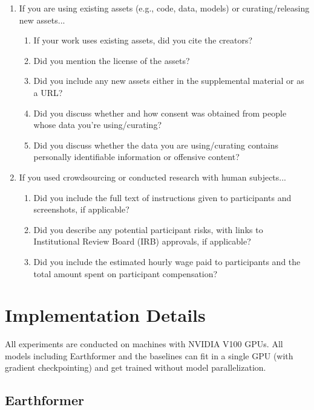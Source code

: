 \documentclass{article}
\begin{document}
\begin{enumerate}
\item If you are using existing assets (e.g., code, data, models) or curating/releasing new assets...
\begin{enumerate}
  \item If your work uses existing assets, did you cite the creators?
    \answerYes{}
  \item Did you mention the license of the assets?
    \answerYes{}
  \item Did you include any new assets either in the supplemental material or as a URL?
    \answerNo{}
  \item Did you discuss whether and how consent was obtained from people whose data you're using/curating?
    \answerNA{}
  \item Did you discuss whether the data you are using/curating contains personally identifiable information or offensive content?
    \answerNA{}
\end{enumerate}


\item If you used crowdsourcing or conducted research with human subjects...
\begin{enumerate}
  \item Did you include the full text of instructions given to participants and screenshots, if applicable?
    \answerNA{}
  \item Did you describe any potential participant risks, with links to Institutional Review Board (IRB) approvals, if applicable?
    \answerNA{}
  \item Did you include the estimated hourly wage paid to participants and the total amount spent on participant compensation?
    \answerNA{}
\end{enumerate}


\end{enumerate}


\clearpage
\appendix

\section{Implementation Details}
\label{sec:implementatoin-details}
All experiments are conducted on machines with NVIDIA V100 GPUs. All models including Earthformer and the baselines can fit in a single GPU (with gradient checkpointing) and get trained without model parallelization.

\subsection{Earthformer}
\end{document}

